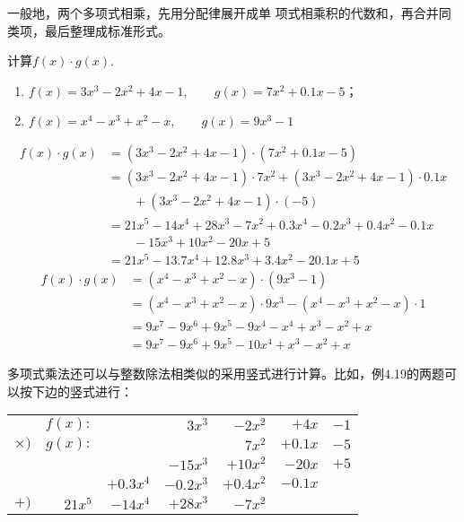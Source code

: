 一般地，两个多项式相乘，先用分配律展开成单
项式相乘积的代数和，再合并同类项，最后整理成标准形式。

\begin{example}
    计算$f(x)\cdot g(x)$.
    \begin{enumerate}
        \item $f(x)=3x^3-2x^2+4x-1,\qquad g(x)=7x^2+0.1x-5$；
        \item $f(x)=x^4-x^3+x^2-x,\qquad g(x)=9x^3-1$
    \end{enumerate} 
\end{example}

\begin{solution}
\[\begin{split}
        f(x)\cdot g(x)&=(3x^3-2x^2+4x-1)\cdot (7x^2+0.1x-5)\\
        &=(3x^3-2x^2+4x-1)\cdot 7x^2+(3x^3-2x^2+4x-1)\cdot 0.1x\\
        &\qquad +(3x^3-2x^2+4x-1)\cdot (-5)\\
&=21x^5-14x^4+28x^3-7x^2+0.3x^4-0.2x^3+0.4x^2-0.1x\\
&\qquad -15x^3+10x^2-20x+5\\
&=21x^5-13.7x^4+12.8x^3+3.4x^2-20.1x+5
    \end{split}\]
\[\begin{split}
    f(x)\cdot g(x)&=(x^4-x^3+x^2-x)\cdot (9x^3-1)\\
    &=(x^4-x^3+x^2-x)\cdot 9x^3-(x^4-x^3+x^2-x)\cdot 1\\
    &=9x^7-9x^6+9x^5-9x^4-x^4+x^3-x^2+x\\
    &=9x^7-9x^6+9x^5-10x^4+x^3-x^2+x
\end{split}\]
\end{solution}

多项式乘法还可以与整数除法相类似的采用竖式进行计算。比如，例4.19的两题可以按下边的竖式进行：
    \begin{center}
        \begin{tabular}{rrrrrrr}
           &    $f(x):$    &        &    $3x^3$    &    $-2x^2$    &    $+4x$    &    $-1$\\
        $\times)$    &    $g(x):$    &        &        &    $7x^2$    &    $+0.1x$    &    $-5$\\
        \hline
            &        &        &    $-15x^3$    &    $+10x^2$    &    $-20x$    &    $+5$\\
            &        &    $+0.3x^4$    &    $-0.2x^3$    &    $+0.4x^2$    &    $-0.1x$    &    \\
        $+)$    &    $21x^5$    &    $-14x^4$    &    $+28x^3$    &    $-7x^2$    &        &    \\
        \hline
        \end{tabular}
    \end{center}   

